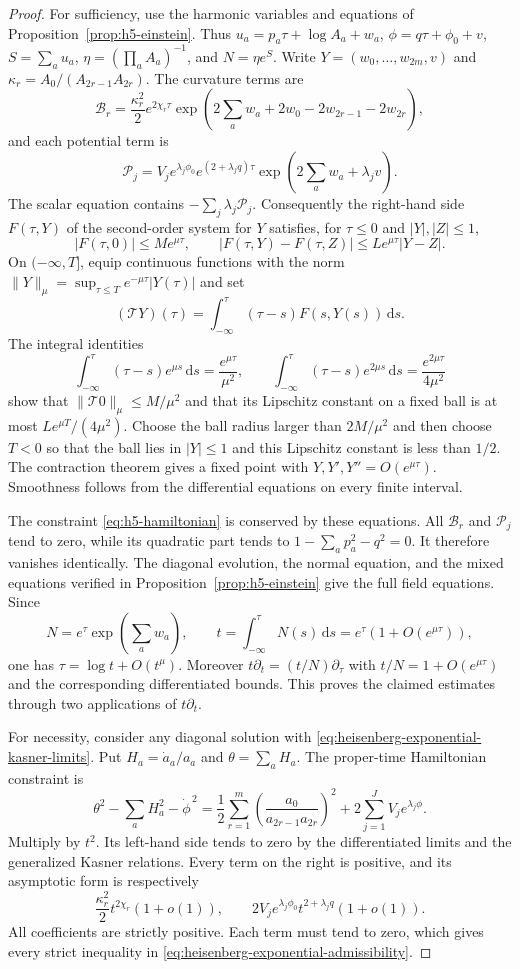 \documentclass[10pt,a4paper]{article}
\numberwithin{equation}{section}
\theoremstyle{definition}
\theoremstyle{remark}
\newcommand{\dd}{\mathrm d}
\begin{document}
\begin{proof}
For sufficiency, use the harmonic variables and equations of
Proposition~\ref{prop:h5-einstein}.  Thus
$u_a=p_a\tau+\log A_a+w_a$, $\phi=q\tau+\phi_0+v$,
$S=\sum_a u_a$, $\eta=(\prod_aA_a)^{-1}$, and $N=\eta e^S$.
Write $Y=(w_0,\ldots,w_{2m},v)$ and
$\kappa_r=A_0/(A_{2r-1}A_{2r})$.  The curvature terms are
\[
 \mathcal B_r=\frac{\kappa_r^2}{2}e^{2\chi_r\tau}
 \exp\!\left(2\sum_a w_a+2w_0-2w_{2r-1}-2w_{2r}\right),
\]
and each potential term is
\[
 \mathcal P_j=V_j e^{\lambda_j\phi_0}
       e^{(2+\lambda_jq)\tau}
       \exp\!\left(2\sum_a w_a+\lambda_jv\right).
\]
The scalar equation contains $-\sum_j\lambda_j\mathcal P_j$.
Consequently the right-hand side $F(\tau,Y)$ of the second-order
system for $Y$ satisfies, for $\tau\le0$ and $|Y|,|Z|\le1$,
\[
 |F(\tau,0)|\le M e^{\mu\tau},\qquad
 |F(\tau,Y)-F(\tau,Z)|\le L e^{\mu\tau}|Y-Z|.
\]
On $(-\infty,T]$, equip continuous functions with the norm
$\|Y\|_\mu=\sup_{\tau\le T}e^{-\mu\tau}|Y(\tau)|$ and set
\[
 (\mathcal TY)(\tau)=
       \int_{-\infty}^{\tau}(\tau-s)F(s,Y(s))\,\dd s.
\]
The integral identities
\[
 \int_{-\infty}^{\tau}(\tau-s)e^{\mu s}\,\dd s
 =\frac{e^{\mu\tau}}{\mu^2},\qquad
 \int_{-\infty}^{\tau}(\tau-s)e^{2\mu s}\,\dd s
 =\frac{e^{2\mu\tau}}{4\mu^2}
\]
show that $\|\mathcal T0\|_\mu\le M/\mu^2$ and that its Lipschitz
constant on a fixed ball is at most $Le^{\mu T}/(4\mu^2)$.
Choose the ball radius larger than $2M/\mu^2$ and then choose $T<0$
so that the ball lies in $|Y|\le1$ and this Lipschitz constant is
less than $1/2$.  The contraction theorem gives a fixed point with
$Y,Y',Y''=O(e^{\mu\tau})$.  Smoothness follows from the differential
equations on every finite interval.

The constraint \eqref{eq:h5-hamiltonian} is conserved by these
equations.  All $\mathcal B_r$ and $\mathcal P_j$ tend to zero, while
its quadratic part tends to $1-\sum_a p_a^2-q^2=0$.
It therefore vanishes identically.  The diagonal evolution, the normal
equation, and the mixed equations verified in
Proposition~\ref{prop:h5-einstein} give the full field equations.
Since
\[
 N=e^\tau\exp\!\left(\sum_a w_a\right),\qquad
 t=\int_{-\infty}^{\tau}N(s)\,\dd s
   =e^\tau(1+O(e^{\mu\tau})),
\]
one has $\tau=\log t+O(t^\mu)$.  Moreover
$t\partial_t=(t/N)\partial_\tau$ with
$t/N=1+O(e^{\mu\tau})$ and the corresponding differentiated bounds.
This proves the claimed estimates through two applications of
$t\partial_t$.

For necessity, consider any diagonal solution with
\eqref{eq:heisenberg-exponential-kasner-limits}.  Put
$H_a=\dot a_a/a_a$ and $\theta=\sum_aH_a$.
The proper-time Hamiltonian constraint is
\[
 \theta^2-\sum_aH_a^2-\dot\phi^{\,2}
 =\frac12\sum_{r=1}^m
       \left(\frac{a_0}{a_{2r-1}a_{2r}}\right)^2
        +2\sum_{j=1}^{J}V_j e^{\lambda_j\phi}.
\]
Multiply by $t^2$.  Its left-hand side tends to zero by the
differentiated limits and the generalized Kasner relations.
Every term on the right is positive, and its asymptotic form is
respectively
\[
 \frac{\kappa_r^2}{2}t^{2\chi_r}(1+o(1)),\qquad
 2V_j e^{\lambda_j\phi_0}t^{2+\lambda_jq}(1+o(1)).
\]
All coefficients are strictly positive.  Each term must tend to zero,
which gives every strict inequality in
\eqref{eq:heisenberg-exponential-admissibility}.


\end{proof}
\end{document}
